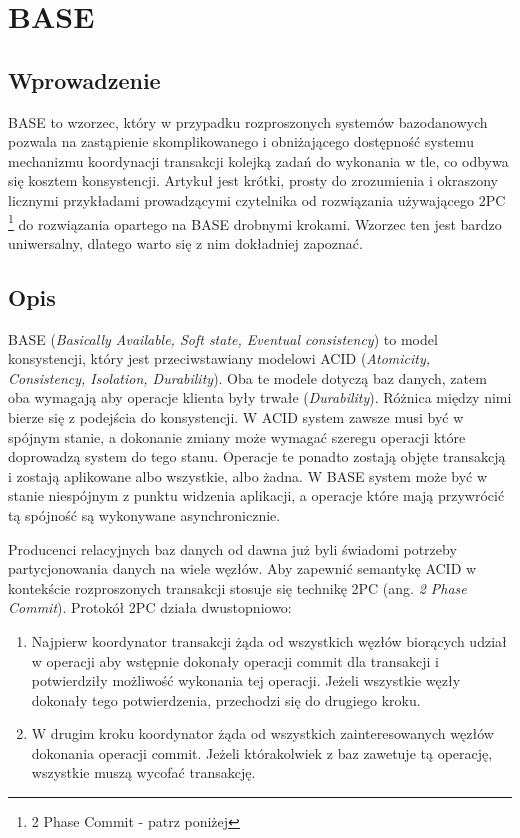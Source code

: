 \section{BASE}

\subsection*{Wprowadzenie}

BASE to wzorzec, który w przypadku rozproszonych systemów bazodanowych pozwala na zastąpienie skomplikowanego i obniżającego dostępność systemu mechanizmu koordynacji transakcji kolejką zadań do wykonania w tle, co odbywa się kosztem konsystencji.
Artykuł \cite{base-an-acid-alternative} jest krótki, prosty do zrozumienia i okraszony licznymi przykładami prowadzącymi czytelnika od rozwiązania używającego 2PC \footnote{2 Phase Commit - patrz poniżej} do rozwiązania opartego na BASE drobnymi krokami.
Wzorzec ten jest bardzo uniwersalny, dlatego warto się z nim dokładniej zapoznać.

\subsection*{Opis}

BASE (\emph{Basically Available, Soft state, Eventual consistency}) to model konsystencji, który jest przeciwstawiany modelowi ACID (\emph{Atomicity, Consistency, Isolation, Durability}). 
Oba te modele dotyczą baz danych, zatem oba wymagają aby operacje klienta były trwałe (\emph{Durability}).
Różnica między nimi bierze się z podejścia do konsystencji.
W ACID system zawsze musi być w spójnym stanie, a dokonanie zmiany może wymagać szeregu operacji które doprowadzą system do tego stanu.
Operacje te ponadto zostają objęte transakcją i zostają aplikowane albo wszystkie, albo żadna.
W BASE system może być w stanie niespójnym z punktu widzenia aplikacji, a operacje które mają przywrócić tą spójność są wykonywane asynchronicznie.

\label{sec:2-phase-commit}
Producenci relacyjnych baz danych od dawna już byli świadomi potrzeby partycjonowania danych na wiele węzłów.
Aby zapewnić semantykę ACID w kontekście rozproszonych transakcji stosuje się technikę 2PC (ang. \emph{2 Phase Commit}).
Protokół 2PC działa dwustopniowo:

\begin{enumerate}
 \item Najpierw koordynator transakcji żąda od wszystkich węzłów biorących udział w operacji aby wstępnie dokonały operacji commit dla transakcji i potwierdziły możliwość wykonania tej operacji.
 Jeżeli wszystkie węzły dokonały tego potwierdzenia, przechodzi się do drugiego kroku.
 \item W drugim kroku koordynator żąda od wszystkich zainteresowanych węzłów dokonania operacji commit.
 Jeżeli którakolwiek z baz zawetuje tą operację, wszystkie muszą wycofać transakcję.
\end{enumerate}

